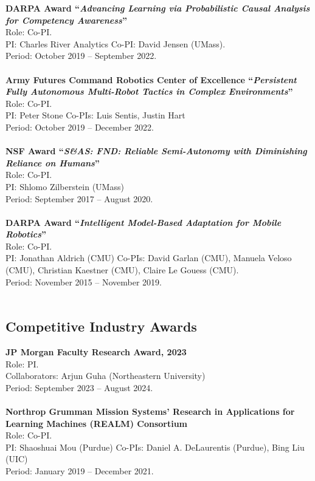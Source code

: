 \documentclass[Times]{article}
\newcommand{\funding}[1]{#1\\}
\renewcommand{\funding}[1]{\\}
\begin{document}
\textbf{DARPA Award ``\emph{Advancing Learning via Probabilistic Causal Analysis for Competency Awareness}''}\\
Role: Co-PI.\\
PI: Charles River Analytics
Co-PI: David Jensen (UMass).\\
Period: October 2019 -- September 2022.\\
\funding{PI Biswas' share: \$587,810.}

\textbf{Army Futures Command Robotics Center of Excellence ``\emph{Persistent Fully Autonomous Multi-Robot Tactics in Complex Environments}''}\\
Role: Co-PI.\\
PI: Peter Stone
Co-PIs: Luis Sentis, Justin Hart\\
Period: October 2019 -- December 2022.\\
\funding{Total funding: \$1,457,250.}

\textbf{NSF Award ``\emph{S\&AS: FND: Reliable Semi-Autonomy with Diminishing Reliance
on Humans}''}\\
Role: Co-PI.\\
PI: Shlomo Zilberstein (UMass)\\
Period: September 2017 -- August 2020.\\
\funding{Total funding: \$699,512.}

\textbf{DARPA Award ``\emph{Intelligent Model-Based Adaptation for Mobile
  Robotics}''}\\
Role: Co-PI.\\
PI: Jonathan Aldrich (CMU)
Co-PIs: David Garlan (CMU), Manuela Veloso
(CMU), Christian Kaestner (CMU), Claire Le Gouess (CMU).\\
Period: November 2015 -- November 2019.\\
\funding{PI Biswas' share: \$377,019.}

\vspace{-1.5em}
\subsection*{Competitive Industry Awards}

\textbf{JP Morgan Faculty Research Award, 2023}\\
Role: PI.\\
Collaborators: Arjun Guha (Northeastern University)\\
Period: September 2023 -- August 2024.\\
\funding{Amount: \$60,000.}

\textbf{Northrop Grumman Mission Systems’ Research in Applications for Learning Machines (REALM) Consortium}\\
Role: Co-PI.\\
PI: Shaoshuai Mou (Purdue)
Co-PIs: Daniel A. DeLaurentis (Purdue), Bing Liu (UIC)\\
Period: January 2019 -- December 2021.\\
\funding{Total funding: \$1,200,000. PI Biswas' share: \$302,668}
\end{document}
